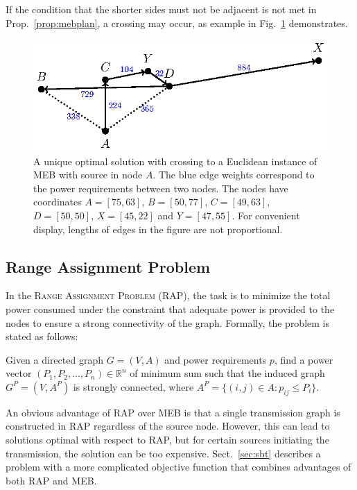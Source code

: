 If the condition that the shorter sides must not be adjacent is not met in Prop.~\ref{prop:mebplan}, a crossing may occur, as example in Fig.~\ref{fig:mebnonplan} demonstrates.
\begin{figure}[htb!]
  \centering
  \includegraphics[scale=1.4]{figurer/mebnonplanar.eps}
  \caption{A unique optimal solution with crossing to a Euclidean instance of  MEB with source in node $A$.
  The blue edge weights correspond to the power requirements between two nodes. 
  The nodes have coordinates $A=[75,63]$, $B=[50,77]$, $C=[49,63]$, $D=[50,50]$, $X=[45,22]$ and $Y=[47,55]$.
  For convenient display, lengths of edges in the figure are not proportional.}
  \label{fig:mebnonplan}
\end{figure}

\subsection{Range Assignment Problem}

In the \textsc{Range Assignment Problem} (RAP), the task is to minimize the total power consumed under the constraint 
that adequate power is provided to the nodes to ensure a strong connectivity of the graph.
Formally, the problem is stated as follows:
\begin{problem}
Given a directed graph $G=(V,A)$ and power requirements $p$, find a power vector $(P_1,P_2,\dots,P_n)\in\mathbb{R}^n$ of minimum sum such that the induced graph $G^P=(V,A^P)$ is strongly connected, 
where $A^P=\{(i,j)\in A: p_{ij}\leq P_i\}$.
\end{problem}

An obvious advantage of RAP over MEB is that a single transmission graph is constructed in RAP regardless of the source node.
However, this can lead to solutions optimal with respect to RAP, but for certain sources initiating the transmission, the solution can be too expensive.
Sect.~\ref{sec:sbt} describes a problem with a more complicated objective function that combines advantages of both RAP and MEB.

